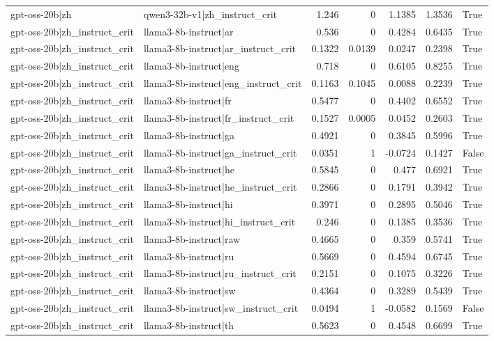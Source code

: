\begin{table}
\begin{tabular}{l l r r r r l}
gpt-oss-20b|zh & qwen3-32b-v1|zh_instruct_crit & 1.246 & 0 & 1.1385 & 1.3536 & True \\
gpt-oss-20b|zh_instruct_crit & llama3-8b-instruct|ar & 0.536 & 0 & 0.4284 & 0.6435 & True \\
gpt-oss-20b|zh_instruct_crit & llama3-8b-instruct|ar_instruct_crit & 0.1322 & 0.0139 & 0.0247 & 0.2398 & True \\
gpt-oss-20b|zh_instruct_crit & llama3-8b-instruct|eng & 0.718 & 0 & 0.6105 & 0.8255 & True \\
gpt-oss-20b|zh_instruct_crit & llama3-8b-instruct|eng_instruct_crit & 0.1163 & 0.1045 & 0.0088 & 0.2239 & True \\
gpt-oss-20b|zh_instruct_crit & llama3-8b-instruct|fr & 0.5477 & 0 & 0.4402 & 0.6552 & True \\
gpt-oss-20b|zh_instruct_crit & llama3-8b-instruct|fr_instruct_crit & 0.1527 & 0.0005 & 0.0452 & 0.2603 & True \\
gpt-oss-20b|zh_instruct_crit & llama3-8b-instruct|ga & 0.4921 & 0 & 0.3845 & 0.5996 & True \\
gpt-oss-20b|zh_instruct_crit & llama3-8b-instruct|ga_instruct_crit & 0.0351 & 1 & -0.0724 & 0.1427 & False \\
gpt-oss-20b|zh_instruct_crit & llama3-8b-instruct|he & 0.5845 & 0 & 0.477 & 0.6921 & True \\
gpt-oss-20b|zh_instruct_crit & llama3-8b-instruct|he_instruct_crit & 0.2866 & 0 & 0.1791 & 0.3942 & True \\
gpt-oss-20b|zh_instruct_crit & llama3-8b-instruct|hi & 0.3971 & 0 & 0.2895 & 0.5046 & True \\
gpt-oss-20b|zh_instruct_crit & llama3-8b-instruct|hi_instruct_crit & 0.246 & 0 & 0.1385 & 0.3536 & True \\
gpt-oss-20b|zh_instruct_crit & llama3-8b-instruct|raw & 0.4665 & 0 & 0.359 & 0.5741 & True \\
gpt-oss-20b|zh_instruct_crit & llama3-8b-instruct|ru & 0.5669 & 0 & 0.4594 & 0.6745 & True \\
gpt-oss-20b|zh_instruct_crit & llama3-8b-instruct|ru_instruct_crit & 0.2151 & 0 & 0.1075 & 0.3226 & True \\
gpt-oss-20b|zh_instruct_crit & llama3-8b-instruct|sw & 0.4364 & 0 & 0.3289 & 0.5439 & True \\
gpt-oss-20b|zh_instruct_crit & llama3-8b-instruct|sw_instruct_crit & 0.0494 & 1 & -0.0582 & 0.1569 & False \\
gpt-oss-20b|zh_instruct_crit & llama3-8b-instruct|th & 0.5623 & 0 & 0.4548 & 0.6699 & True \\

\end{tabular}
\end{table}
